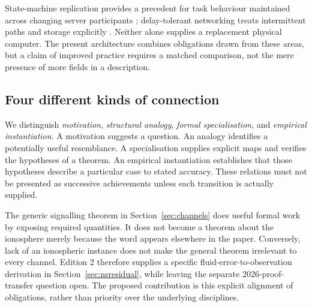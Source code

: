 State-machine replication provides a precedent for task behaviour maintained across changing server participants \citep{schneider}; delay-tolerant networking treats intermittent paths and storage explicitly \citep{dtn}. Neither alone supplies a replacement physical computer. The present architecture combines obligations drawn from these areas, but a claim of improved practice requires a matched comparison, not the mere presence of more fields in a description.

\subsection{Four different kinds of connection}
We distinguish \emph{motivation}, \emph{structural analogy}, \emph{formal specialisation}, and \emph{empirical instantiation}. A motivation suggests a question. An analogy identifies a potentially useful resemblance. A specialisation supplies explicit maps and verifies the hypotheses of a theorem. An empirical instantiation establishes that those hypotheses describe a particular case to stated accuracy. These relations must not be presented as successive achievements unless each transition is actually supplied.

The generic signalling theorem in Section~\ref{sec:channels} does useful formal work by exposing required quantities. It does not become a theorem about the ionosphere merely because the word appears elsewhere in the paper. Conversely, lack of an ionospheric instance does not make the general theorem irrelevant to every channel. Edition 2 therefore supplies a specific fluid-error-to-observation derivation in Section~\ref{sec:nsresidual}, while leaving the separate 2026-proof-transfer question open. The proposed contribution is this explicit alignment of obligations, rather than priority over the underlying disciplines.
